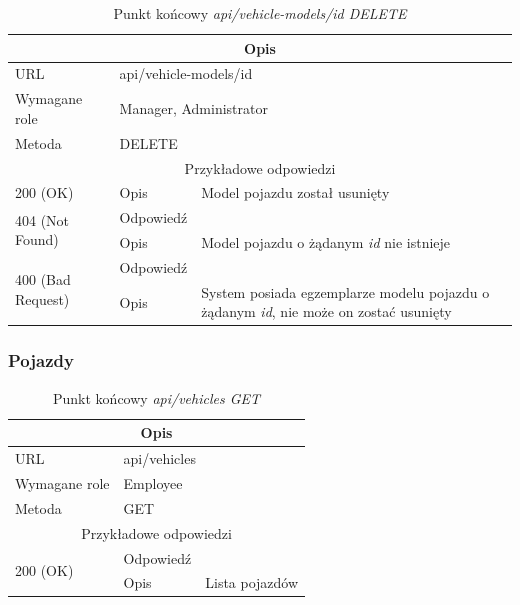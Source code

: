 \documentclass[eng,printmode,openany]{mgr}
\begin{document}
	\begin{table}[H]
		\caption{Punkt końcowy \textit{api/vehicle-models/id DELETE}}
		\begin{tabularx}{\textwidth}{|l|l|X|}
			\hline
			\multicolumn{3}{|c|}{Opis}                         						\\ \hline
			URL                       & \multicolumn{2}{l|}{api/vehicle-models/id} 	\\ \hline
			Wymagane role             & \multicolumn{2}{l|}{Manager, Administrator} \\ \hline
			Metoda                    & \multicolumn{2}{l|}{DELETE} 				\\ \hline
			\multicolumn{3}{|c|}{ Przykładowe odpowiedzi}                   		\\ \hline
			200 (OK)			& Opis         	& Model pojazdu został usunięty		\\ \hline
			\multirow{2}{*}{404 (Not Found)} 	& Odpowiedź     &     	\\ \cline{2-3} 
			& Opis          & Model pojazdu o żądanym \textit{id} nie istnieje  											\\ \hline
			\multirow{2}{*}{400 (Bad Request)} 	& Odpowiedź     &     	\\ \cline{2-3} 
			& Opis          & System posiada egzemplarze modelu pojazdu o żądanym \textit{id}, nie może on zostać usunięty 	\\ \hline
		\end{tabularx}
	\end{table}
	
	\subsubsection{Pojazdy}
	\begin{table}[H]
		\caption{Punkt końcowy \textit{api/vehicles GET}}
		\begin{tabularx}{\textwidth}{|l|l|X|}
			\hline
			\multicolumn{3}{|c|}{Opis}                         						\\ \hline
			URL                       & \multicolumn{2}{l|}{api/vehicles} 			\\ \hline
			Wymagane role             & \multicolumn{2}{l|}{Employee} 				\\ \hline
			Metoda                    & \multicolumn{2}{l|}{GET} 					\\ \hline
			\multicolumn{3}{|c|}{ Przykładowe odpowiedzi}                   		\\ \hline
			\multirow{2}{*}{200 (OK)} 			& Odpowiedź     &        	\\ \cline{2-3} 
			& Opis         	& Lista pojazdów       												\\ \hline
		\end{tabularx}
	\end{table}
	
\end{document}
